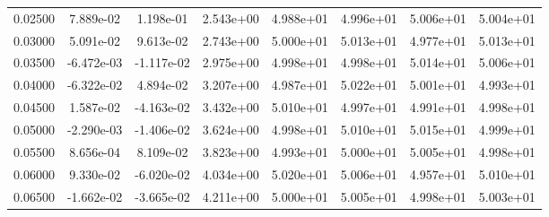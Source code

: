 \documentclass[]{article}
\begin{document}
\begin{table}[H]
\begin{center}
\begin{tabular}{cccccccc}
				\footnotesize 0.02500 & \footnotesize 7.889e-02 & \footnotesize 1.198e-01 & \footnotesize 2.543e+00 & \footnotesize 4.988e+01 & \footnotesize 4.996e+01 & \footnotesize 5.006e+01 & \footnotesize 5.004e+01 \\
				
				\footnotesize 0.03000 & \footnotesize 5.091e-02 & \footnotesize 9.613e-02 & \footnotesize 2.743e+00 & \footnotesize 5.000e+01 & \footnotesize 5.013e+01 & \footnotesize 4.977e+01 & \footnotesize 5.013e+01 \\
				
				\footnotesize 0.03500 & \footnotesize -6.472e-03 & \footnotesize -1.117e-02 & \footnotesize 2.975e+00 & \footnotesize 4.998e+01 & \footnotesize 4.998e+01 & \footnotesize 5.014e+01 & \footnotesize 5.006e+01 \\
				
				\footnotesize 0.04000 & \footnotesize -6.322e-02 & \footnotesize 4.894e-02 & \footnotesize 3.207e+00 & \footnotesize 4.987e+01 & \footnotesize 5.022e+01 & \footnotesize 5.001e+01 & \footnotesize 4.993e+01 \\
				
				\footnotesize 0.04500 &  \footnotesize 1.587e-02 & \footnotesize -4.163e-02 & \footnotesize 3.432e+00 & \footnotesize 5.010e+01 & \footnotesize 4.997e+01 & \footnotesize 4.991e+01 & \footnotesize 4.998e+01 \\
				
				\footnotesize 0.05000 &  \footnotesize -2.290e-03 & \footnotesize -1.406e-02 & \footnotesize 3.624e+00 & \footnotesize 4.998e+01 & \footnotesize 5.010e+01 & \footnotesize 5.015e+01 & \footnotesize 4.999e+01 \\
				
				\footnotesize 0.05500 &  \footnotesize 8.656e-04 & \footnotesize 8.109e-02 & \footnotesize 3.823e+00 & \footnotesize 4.993e+01 & \footnotesize 5.000e+01 & \footnotesize 5.005e+01 & \footnotesize 4.998e+01 \\
				
				\footnotesize 0.06000 &  \footnotesize 9.330e-02 & \footnotesize -6.020e-02 & \footnotesize 4.034e+00 & \footnotesize 5.020e+01 & \footnotesize 5.006e+01 & \footnotesize 4.957e+01 & \footnotesize 5.010e+01 \\
				
				\footnotesize 0.06500 &  \footnotesize -1.662e-02 & \footnotesize -3.665e-02 & \footnotesize 4.211e+00 & \footnotesize 5.000e+01 & \footnotesize 5.005e+01 & \footnotesize 4.998e+01 & \footnotesize 5.003e+01 \\
				

\end{tabular}
\end{center}
\end{table}
\end{document}
